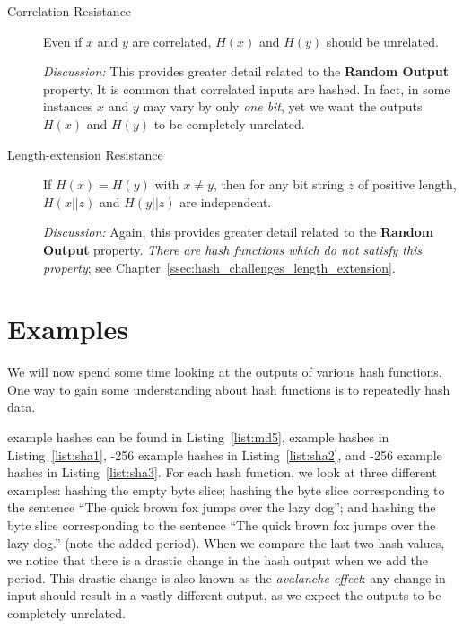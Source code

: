 \begin{description}
\item [Correlation Resistance]
    Even if $x$ and $y$ are correlated, $H(x)$ and $H(y)$
        should be unrelated.

    \emph{Discussion:} This provides greater detail related to
        the \textbf{Random Output} property.
        It is common that correlated inputs are hashed.
        In fact, in some instances $x$ and $y$ may vary by only \emph{one bit},
        yet we want the outputs $H(x)$ and $H(y)$ to be completely
        unrelated.
 \item [Length-extension Resistance]
    If $H(x) = H(y)$ with $x\ne y$, then for any bit string $z$
    of positive length, $H(x||z)$ and $H(y||z)$ are independent.

    \emph{Discussion:} Again, this provides greater detail related to
        the \textbf{Random Output} property.
    \emph{There are \glspl{hash function} which do not satisfy this property};
        see Chapter~\ref{ssec:hash_challenges_length_extension}.
\end{description}



\section{Examples}
\label{sec:hash_examples}

We will now spend some time looking at the outputs of various
\glspl{hash function}.
One way to gain some understanding about \glspl{hash function}
is to repeatedly hash data.






\MDFive{} example hashes can be found in Listing~\ref{list:md5},
\ShaOne{} example hashes in Listing~\ref{list:sha1},
\ShaTwo{}-256 example hashes in Listing~\ref{list:sha2}, and
\ShaThree{}-256 example hashes in Listing~\ref{list:sha3}.
For each \gls{hash function}, we look at three different examples:
hashing the empty byte slice;
hashing the byte slice corresponding to the sentence
``The quick brown fox jumps over the lazy dog'';
and hashing the byte slice corresponding to the sentence
``The quick brown fox jumps over the lazy dog.''
(note the added period).
When we compare the last two hash values, we notice that there
is a drastic change in the hash output when we add the period.
This drastic change is also known as the \emph{avalanche effect}:
any change in input should result in a vastly different output,
as we expect the outputs to be completely unrelated.

